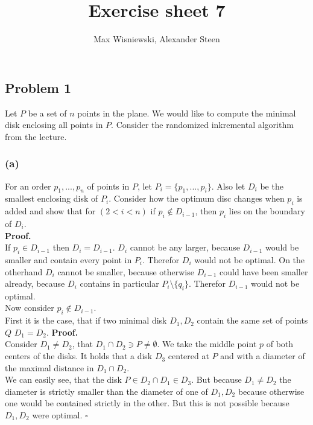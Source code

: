 \documentclass[11pt,a4paper,ngerman]{article}
\date{}
\title{Exercise sheet 7}
\author{Max Wisniewski, Alexander Steen}
\begin{document}

\renewcommand{\figurename}{Figure}

\maketitle
\thispagestyle{fancy}

\subsection*{Problem 1}

Let $P$ be a set of $n$ points in the plane. We would like to compute the minimal disk enclosing all points in $P$.
Consider the randomized inkremental algorithm from the lecture.

\subsubsection*{(a)}
For an order $p_1, ... , p_n$ of points in $P$, let $P_i =  \{ p_1, ... , p_i \}$. Also let $D_i$
be the smallest enclosing disk of $P_i$. Consider how the optimum disc changes when $p_i$ is added and
show that for $(2 < i < n)$ if $p_i \not\in D_{i-1}$, then $p_i$ lies on the boundary of $D_i$.\\

\textbf{Proof.}\\

If $p_i \in D_{i-1}$ then $D_i = D_{i-1}$. $D_i$ cannot be any larger, because $D_{i-1}$ would be smaller and contain
every point in $P_i$. Therefor $D_i$ would not be optimal. On the otherhand $D_i$ cannot be smaller, because
otherwise $D_{i-1}$ could have been smaller already, because $D_i$ contains in particular $P_i \setminus \{ q_i \}$.
Therefor $D_{i-1}$ would not be optimal.\\

Now consider $p_i \not\in D_{i-1}$.\\
First it is the case, that if two minimal disk $D_1, D_2$ contain the same set of points $Q$ $D_1 = D_2$.
\textbf{Proof.}\\
Consider $D_1 \not= D_2$, that $D_1 \cap D_2 \ni P \not= \emptyset$. We take the middle point $p$ of both centers
of the disks. It holds that a disk $D_3$ centered at $P$ and with a diameter of the maximal distance in $D_1 \cap D_2$.\\
We can easily see, that the disk $P \in D_2 \cap D_1 \in D_3$. But because $D_1 \not= D_2$ the diameter is strictly
smaller than the diameter of one of $D_1, D_2$ because otherwise one would be contained strictly in the other.
But this is not possible because $D_1, D_2$ were optimal.
\mbox{} \hfill $\square$
\end{document}
